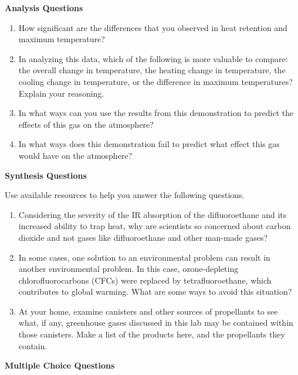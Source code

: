 \documentclass[english,twoside]{article}
\begin{document}
\textbf{Analysis Questions}
\begin{enumerate}
	\item How significant are the differences that you observed in heat retention and maximum temperature?
	\answerspace{2.0in}
	\item In analyzing this data, which of the following is more valuable to compare: the overall change in temperature, the heating change in temperature, the cooling change in temperature, or the difference in maximum temperatures? Explain your reasoning.
	\answerspace{3.0in}
	\item In what ways can you use the results from this demonstration to predict the effects of this gas on the atmosphere?
	\answerspace{2.0in}
	\item In what ways does this demonstration fail to predict what effect this gas would have on the atmosphere?
	\answerspace{2.0in}
\end{enumerate}

\textbf{Synthesis Questions}

Use available resources to help you answer the following questions.

\begin{enumerate}
	\item Considering the severity of the IR absorption of the difluoroethane and its increased ability to trap heat, why are scientists so concerned about carbon dioxide and not gases like difluoroethane and other man-made gases?
	\answerspace{3.0in}
	\item In some cases, one solution to an environmental problem can result in another environmental problem. In this case, ozone-depleting chlorofluorocarbons (CFCs) were replaced by tetrafluoroethane, which contributes to global warming. What are some ways to avoid this situation?
	\answerspace{3.0in}
	\item At your home, examine canisters and other sources of propellants to see what, if any, greenhouse gases discussed in this lab may be contained within those canisters. Make a list of the products here, and the propellants they contain.
	\answerspace{3.5in}
\end{enumerate}
\newpage
\textbf{Multiple Choice Questions}
\end{document}
